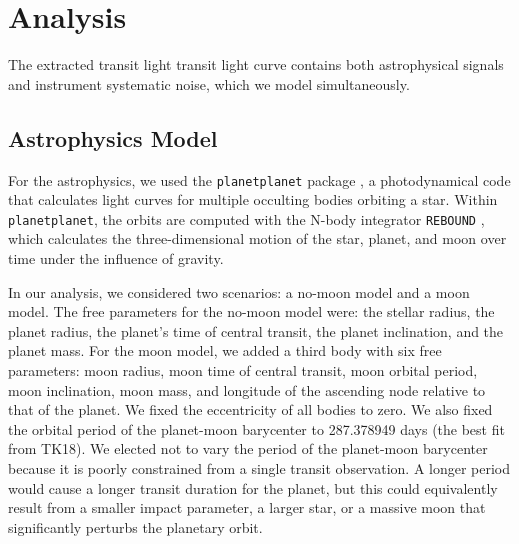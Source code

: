 \documentclass[twocolumn,trackchanges]{aastex62}
\begin{document}
\section{Analysis}
The extracted transit light transit light curve contains both astrophysical signals and instrument systematic noise, which we model simultaneously. 

\subsection{Astrophysics Model}
For the astrophysics, we used the \texttt{planetplanet} package \citep{luger17}, a photodynamical code that calculates light curves for multiple occulting bodies orbiting a star. Within \texttt{planetplanet}, the orbits are computed with the N-body integrator \texttt{REBOUND} \citep{rein12}, which calculates the three-dimensional motion of the star, planet, and moon over time under the influence of gravity. %

In our analysis, we considered two scenarios: a no-moon model and a moon model. The free parameters for the no-moon model were: the stellar radius, the planet radius, the planet's time of central transit, the planet inclination, and the planet mass. For the moon model, we added a third body with six free parameters: moon radius, moon time of central transit, moon orbital period, moon inclination, moon mass, and longitude of the ascending node relative to that of the planet.  We fixed the eccentricity of all bodies to zero. We also fixed the  orbital period of the planet-moon barycenter to 287.378949 days (the best fit from TK18). We elected not to vary the period of the planet-moon barycenter because it is poorly constrained from a single transit observation. A longer period would cause a longer transit duration for the planet, but this could equivalently result from a smaller impact parameter, a larger star, or a massive moon that significantly perturbs the planetary orbit.
\end{document}
